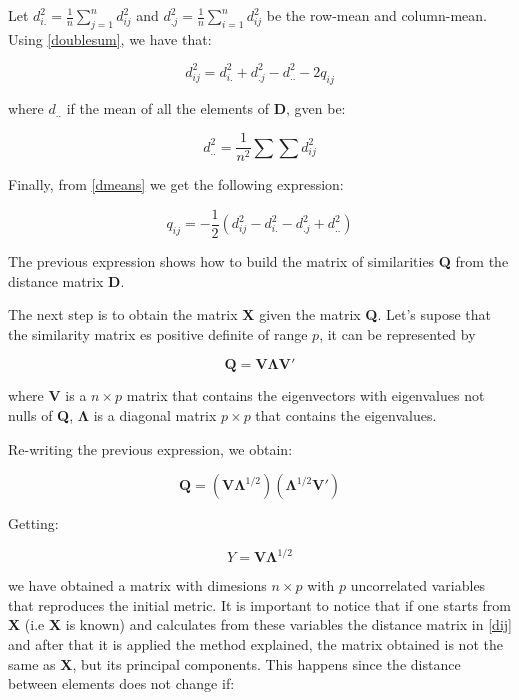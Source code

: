 \documentclass[11pt]{report}
\begin{document}
\indent Let $d_{i.}^2 = \frac{1}{n}\sum_{j = 1}^n d_{ij}^2$ and $d_{.j}^2 = \frac{1}{n}\sum_{i=1}^n d_{ij}^2$ 
be the row-mean and column-mean. Using \ref{doublesum}, we have that:

\begin{equation} \label{dmeans}
d_{ij}^2 = d_{i.}^2 + d_{.j}^2 - d_{..}^2-2q_{ij}
\end{equation}

where $d_{..}$ if the mean of all the elements of \textbf{D}, gven be:

$$d_{..}^2 = \frac{1}{n^2}\sum \sum d_{ij}^2$$

\indent Finally, from \ref{dmeans} we get the following expression:

\begin{equation} \label{qij2}
q_{ij} = -\frac{1}{2}(d_{ij}^2 - d_{i.}^2 - d_{.j}^2 + d_{..}^2)
\end{equation}

\indent The previous expression shows how to build the matrix of similarities \textbf{Q}
from the distance matrix \textbf{D}.

\indent The next step is to obtain the matrix \textbf{X} given the matrix \textbf{Q}.
Let's supose that the similarity matrix es positive definite of range $p$, it can
be represented by 

$$\mathbf{Q} = \mathbf{V}\mathbf{\Lambda}\mathbf{V'}$$

where $\mathbf{V}$ is a $n \times p$ matrix that contains the eigenvectors with
eigenvalues not nulls of \textbf{Q}, $\mathbf{\Lambda}$ is a diagonal matrix 
$p \times p$ that contains the eigenvalues.

\indent Re-writing the previous expression, we obtain:

\begin{equation} \label{generalQ}
\mathbf{Q} = (\mathbf{V}\mathbf{\Lambda}^{1/2})(\mathbf{\Lambda}^{1/2}\mathbf{V'})
\end{equation}

Getting:

$$Y = \mathbf{V}\mathbf{\Lambda}^{1/2}$$

we have obtained a matrix with dimesions $n \times p$ with $p$ uncorrelated
variables that reproduces the initial metric. It is important to notice that if 
one starts from \textbf{X} (i.e \textbf{X} is known) and calculates from these
variables the distance matrix in \ref{dij} and after that it is applied
the method explained, the matrix obtained is not the same as \textbf{X}, but
its principal components. This happens since the distance between elements
does not change if:
\end{document}
